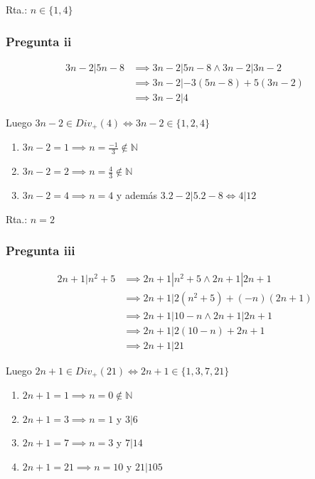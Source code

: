 Rta.: $ n \in \{ 1,4 \} $

\subsubsection{Pregunta ii}
\begin{align*}
    3n-2 | 5n-8 &\implies 3n-2 | 5n-8 \wedge 3n-2 | 3n-2 \\
    &\implies 3n-2 | -3(5n-8) + 5(3n-2) \\
    &\implies 3n-2 | 4
\end{align*}

Luego $ 3n-2 \in Div_+(4) \iff 3n-2 \in \{ 1,2,4 \} $

\begin{enumerate}[label=(\alph*)]
    \item $ 3n-2 = 1 \implies n = \frac{-1}{3} \not \in \mathbb{N}$
    \item $ 3n-2 = 2 \implies n = \frac{4}{3} \not \in \mathbb{N}$
    \item $ 3n-2 = 4 \implies n = 4 $ y además $ 3.2-2|5.2-8 \iff 4|12 $
\end{enumerate}

Rta.: $n = 2$

\subsubsection{Pregunta iii}
\begin{align*}
    2n+1 | n^2+5 &\implies 2n+1 | n^2+5 \wedge 2n+1 | 2n+1 \\
    &\implies 2n+1 | 2(n^2+5) + (-n)(2n+1) \\
    &\implies 2n+1 | 10-n \wedge 2n+1 | 2n+1 \\
    &\implies 2n+1 | 2(10-n) + 2n+1 \\
    &\implies 2n+1 | 21
\end{align*}
  
Luego $ 2n+1 \in Div_+(21) \iff 2n+1 \in \{ 1,3,7,21 \}$

\begin{enumerate}[label=(\alph*)]
    \item $2n+1 = 1 \implies n = 0 \not \in \mathbb{N}$
    \item $2n+1 = 3 \implies n = 1 $ y $ 3|6 $
    \item $2n+1 = 7 \implies n = 3 $ y $ 7|14 $
    \item $2n+1 = 21 \implies n = 10 $ y $ 21|105 $
\end{enumerate}

